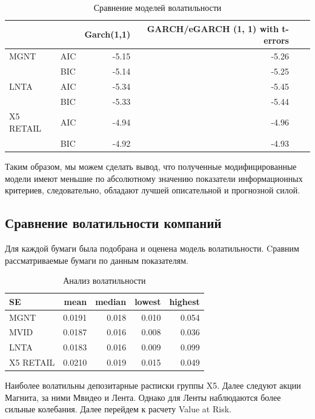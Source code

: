 \documentclass[a4paper,12pt,twoside]{article}
\begin{document}
\begin{table}[!h]
\centering
\begin{tabular}{llrrrr}
  \hline
          & & Garch(1,1) & GARCH/eGARCH (1, 1) with t-errors \\
  \hline
  MGNT & AIC &  -5.15 & -5.26  \\
       & BIC &  -5.14 & -5.25 \\
  \hline
  LNTA & AIC &  -5.34 & -5.45 \\
       & BIC &  -5.33 & -5.44 \\
  \hline
  X5 RETAIL & AIC &  -4.94 & -4.96 \\
            & BIC &  -4.92 & -4.93 \\
  \hline
\end{tabular}
\caption{Сравнение моделей волатильности}
\end{table}

Таким образом, мы можем сделать вывод, что полученные модифицированные модели имеют меньшие по абсолютному значению показатели информационных критериев, следовательно, обладают лучшей описательной и прогнозной силой.

\subsection{Сравнение волатильности компаний}

Для каждой бумаги была подобрана и оценена модель волатильности.
Cравним рассматриваемые бумаги по данным показателям.

\begin{table}[!h]
\centering
\begin{tabular}{lrrrr}
  \hline
    SE      & mean & median & lowest & highest \\
  \hline
  MGNT & 0.0191 &  0.018 & 0.010 & 0.054\\
  MVID & 0.0187 &  0.016 & 0.008 & 0.036\\
  LNTA & 0.0183 &  0.016 & 0.009 & 0.099\\
  X5 RETAIL & 0.0210 &  0.019 & 0.015 & 0.049 \\
  \hline
\end{tabular}
\caption{Анализ волатильности}
\end{table}

Наиболее волатильны депозитарные расписки группы X5.
Далее следуют акции Магнита, за ними Мвидео и Лента.
Однако для Ленты наблюдаются более сильные колебания.
Далее перейдем к расчету Value at Risk.
\end{document}
